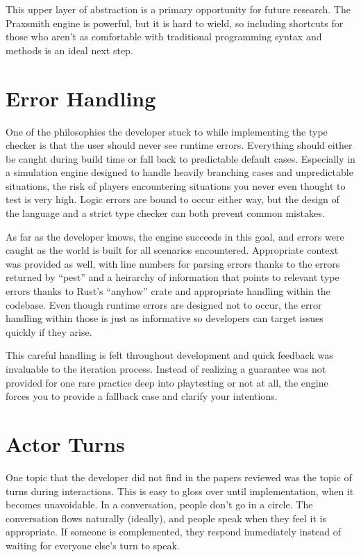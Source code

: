 This upper layer of abstraction is a primary opportunity for future research. The
Praxsmith engine is powerful, but it is hard to wield, so including shortcuts for
those who aren't as comfortable with traditional programming syntax and methods
is an ideal next step.

\section{Error Handling} \label{sec:ErrorHandling}

One of the philosophies the developer stuck to while implementing the type checker is
that the user should never see runtime errors. Everything should either be caught
during build time or fall back to predictable default cases. Especially in a simulation
engine designed to handle heavily branching cases and unpredictable situations, the
risk of players encountering situations you never even thought to test is very high.
Logic errors are bound to occur either way, but the design of the language and a strict
type checker can both prevent common mistakes.

As far as the developer knows, the engine succeeds in this goal, and errors were caught
as the world is built for all scenarios encountered. Appropriate context was provided
as well, with line numbers for parsing errors thanks to the errors returned by ``pest''
and a heirarchy of information that points to relevant type errors thanks to Rust's
``anyhow'' crate and appropriate handling within the codebase. Even though runtime
errors are designed not to occur, the error handling within those is just as informative
so developers can target issues quickly if they arise.

This careful handling is felt throughout development and quick feedback was invaluable
to the iteration process. Instead of realizing a guarantee was not provided for one
rare practice deep into playtesting or not at all, the engine forces you to provide
a fallback case and clarify your intentions.

\section{Actor Turns} \label{sec:ActorTurns}

One topic that the developer did not find in the papers reviewed was the topic of
turns during interactions. This is easy to gloss over until implementation, when it
becomes unavoidable. In a conversation, people don't go in a circle. The conversation
flows naturally (ideally), and people speak when they feel it is appropriate. If someone
is complemented, they respond immediately instead of waiting for everyone else's turn
to speak.

